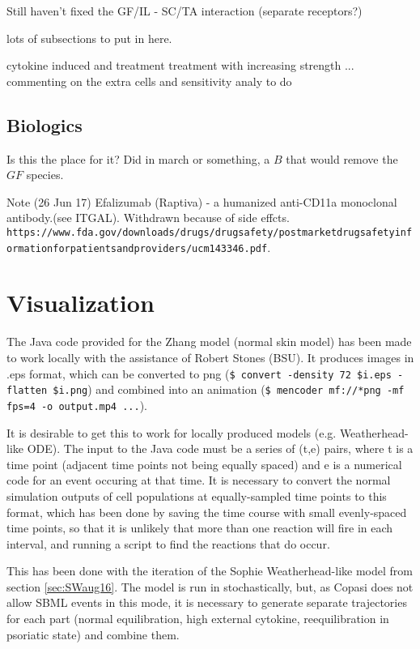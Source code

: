 \documentclass[a4paper,10pt]{report}
\begin{document}
Still haven't fixed the GF/IL - SC/TA interaction (separate receptors?)

lots of subsections to put  in here. 

cytokine induced and treatment 
treatment with increasing strength
 ... commenting on the extra cells and 
sensitivity analy to do 

\subsection{Biologics}

Is this the place for it? Did in march or something, a $B$ that would remove
the $GF$ species.

Note (26 Jun 17) Efalizumab (Raptiva) - a humanized anti-CD11a monoclonal antibody.(see ITGAL). Withdrawn because of side effcts. 
{\tt https://www.fda.gov/downloads/drugs/drugsafety/postmarketdrugsafetyinformationforpatientsandproviders/ucm143346.pdf}.




\section{Visualization}\label{sec:SWvisu}

The Java code provided for the Zhang model (normal skin model) has been made to work locally with the assistance of Robert Stones (BSU). It produces images in .eps format, which can be converted to png ({\tt \$ convert -density 72  \$i.eps -flatten \$i.png}) and combined into an animation ({\tt \$ mencoder mf://*png -mf fps=4 -o output.mp4 ...}).

It is desirable to get this to work for locally produced models (e.g. Weatherhead-like ODE). 
The input to the Java code must be a series of (t,e) pairs, where t is a time point (adjacent time points not being equally spaced) and e is a numerical code for an event occuring at that time. It is necessary to convert the normal simulation outputs of cell populations at equally-sampled time points to this format, which
has been done by saving the time course with small evenly-spaced time points, so that it is unlikely that more than one reaction will fire in each interval, and running a script to find the reactions that do occur. 

This has been done with the iteration of the Sophie Weatherhead-like model from 
section \ref{sec:SWaug16}. The model is run in stochastically, but, as Copasi does not allow SBML events in this mode, it is necessary to generate separate trajectories for each part (normal equilibration, high external cytokine, reequilibration in psoriatic state) and combine them. 
\end{document}
